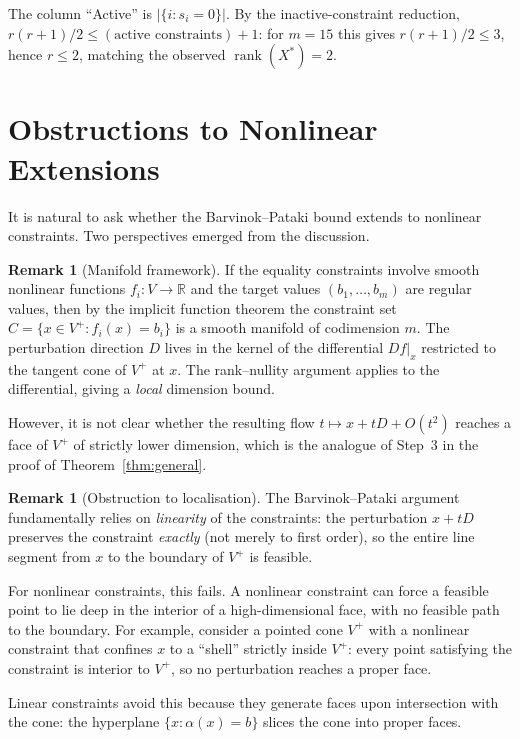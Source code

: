 \documentclass[11pt,a4paper]{article}
\theoremstyle{definition}
\newtheorem{remark}[theorem]{Remark}
\newcommand{\R}{\mathbb{R}}
\newcommand{\rank}{\operatorname{rank}}
\begin{document}
\noindent
The column ``Active'' is $|\{i : s_i = 0\}|$.  By the
inactive-constraint reduction, $r(r{+}1)/2 \leq
(\text{active constraints}) + 1$: for $m = 15$ this gives
$r(r{+}1)/2 \leq 3$, hence $r \leq 2$, matching the observed
$\rank(X^*) = 2$.

\section{Obstructions to Nonlinear Extensions}
\label{sec:nonlinear}

It is natural to ask whether the Barvinok--Pataki bound extends to
nonlinear constraints.  Two perspectives emerged from the discussion.

\begin{remark}[Manifold framework]
If the equality constraints involve smooth nonlinear functions
$f_i \colon V \to \R$ and the target values $(b_1, \ldots, b_m)$
are regular values, then by the implicit function theorem the
constraint set $C = \{x \in V^+ : f_i(x) = b_i\}$ is a smooth
manifold of codimension $m$.  The perturbation direction $D$ lives
in the kernel of the differential $Df|_x$ restricted to the tangent
cone of $V^+$ at $x$.  The rank--nullity argument applies to the
differential, giving a \emph{local} dimension bound.

However, it is not clear whether the resulting flow
$t \mapsto x + tD + O(t^2)$ reaches a face of $V^+$ of strictly
lower dimension, which is the analogue of Step~3 in the proof of
Theorem~\ref{thm:general}.
\end{remark}

\begin{remark}[Obstruction to localisation]
The Barvinok--Pataki argument fundamentally relies on
\emph{linearity} of the constraints: the perturbation $x + tD$
preserves the constraint \emph{exactly} (not merely to first
order), so the entire line segment from $x$ to the boundary of
$V^+$ is feasible.

For nonlinear constraints, this fails.  A nonlinear constraint
can force a feasible point to lie deep in the interior of a
high-dimensional face, with no feasible path to the boundary.
For example, consider a pointed cone $V^+$ with a nonlinear constraint
that confines $x$ to a ``shell'' strictly inside $V^+$: every
point satisfying the constraint is interior to $V^+$, so no
perturbation reaches a proper face.

Linear constraints avoid this because they generate faces upon
intersection with the cone: the hyperplane $\{x : \alpha(x) = b\}$
slices the cone into proper faces.
\end{remark}
\end{document}
